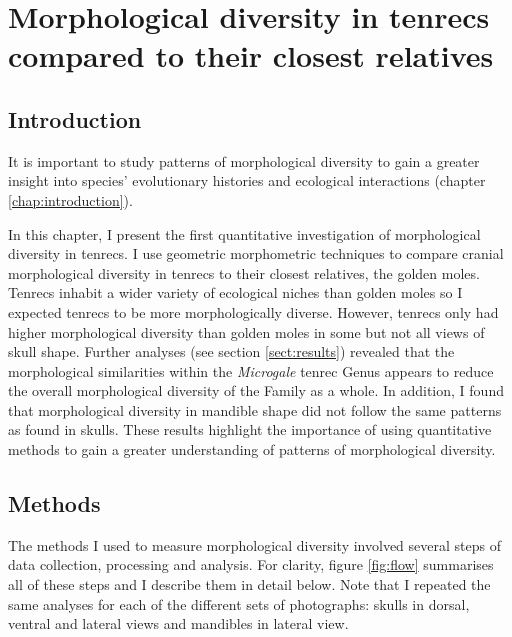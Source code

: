 \chapter{Morphological diversity in tenrecs compared to their closest relatives}
\label{chap:disparity}


\section{Introduction}


	It is important to study patterns of morphological diversity to gain a greater insight into species' evolutionary histories and ecological interactions (chapter \ref{chap:introduction}). 
	
	In this chapter, I present the first quantitative investigation of morphological diversity in tenrecs. I use geometric morphometric techniques \citep{Rohlf1993} to compare cranial morphological diversity in tenrecs to their closest relatives, the golden moles. Tenrecs inhabit a wider variety of ecological niches than golden moles \citep{Soarimalala2011, Bronner1995} so I expected tenrecs to be more morphologically diverse. However, tenrecs only had higher morphological diversity than golden moles in some but not all views of skull shape. Further analyses (see section \ref{sect:results}) revealed that the morphological similarities within the \textit{Microgale} tenrec Genus appears to reduce the overall morphological diversity of the Family as a whole. In addition, I found that morphological diversity in mandible shape did not follow the same patterns as found in skulls.
	These results highlight the importance of using quantitative methods to gain a greater understanding of patterns of morphological diversity.

\section{Methods}

	The methods I used to measure morphological diversity involved several steps of data collection, processing and analysis. For clarity,  figure \ref{fig:flow} summarises all of these steps and I describe them in detail below. Note that I repeated the same analyses for each of the different sets of photographs: skulls in dorsal, ventral and lateral views and mandibles in lateral view.
	
